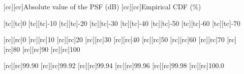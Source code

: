 [cc][cc]{\footnotesize Absolute value of the \acs{PSF} (\si{\deci\bel})}
[cc][cc]{\footnotesize Empirical \acs{CDF} (\si{\percent})}

[tc][tc]{\scriptsize 0}
[tc][tc]{\scriptsize -10}
[tc][tc]{\scriptsize -20}
[tc][tc]{\scriptsize -30}
[tc][tc]{\scriptsize -40}
[tc][tc]{\scriptsize -50}
[tc][tc]{\scriptsize -60}
[tc][tc]{\scriptsize -70}

[rc][rc]{\scriptsize 0}
[rc][rc]{\scriptsize 10}
[rc][rc]{\scriptsize 20}
[rc][rc]{\scriptsize 30}
[rc][rc]{\scriptsize 40}
[rc][rc]{\scriptsize 50}
[rc][rc]{\scriptsize 60}
[rc][rc]{\scriptsize 70}
[rc][rc]{\scriptsize 80}
[rc][rc]{\scriptsize 90}
[rc][rc]{\scriptsize 100}


[rc][rc]{\tiny 99.90}
[rc][rc]{\tiny 99.92}
[rc][rc]{\tiny 99.94}
[rc][rc]{\tiny 99.96}
[rc][rc]{\tiny 99.98}
[rc][rc]{\tiny 100.0}

